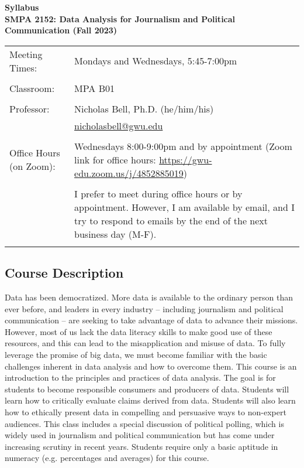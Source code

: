\documentclass[12pt,letterpaper]{article}
\begin{document}
\begin{center}
\large
\textbf{Syllabus\\
\bigskip
SMPA 2152: Data Analysis for Journalism and Political Communication (Fall 2023)}
\end{center}

\begin{tabularx}{\textwidth}{l>{\raggedright\arraybackslash}X}
Meeting Times: & Mondays and Wednesdays, 5:45-7:00pm \\
\\
Classroom: & MPA B01 \\
\\
Professor: & Nicholas Bell, Ph.D. (he/him/his) \\
& \href{mailto:nicholasbell@gwu.edu}{nicholasbell@gwu.edu} \\
\\
Office Hours (on Zoom): & Wednesdays 8:00-9:00pm and by appointment \newline
(Zoom link for office hours: \href{https://gwu-edu.zoom.us/j/4852885019}{https://gwu-edu.zoom.us/j/4852885019})\\
\\
& I prefer to meet during office hours or by appointment. However, I am available by email, and I try to respond to emails by the end of the next business day (M-F).\\
\\
\hline
\end{tabularx}

\subsection*{Course Description}

Data has been democratized. More data is available to the ordinary person than ever before, and leaders in every industry -- including journalism and political communication -- are seeking to take advantage of data to advance their missions. However, most of us lack the data literacy skills to make good use of these resources, and this can lead to the misapplication and misuse of data. To fully leverage the promise of big data, we must become familiar with the basic challenges inherent in data analysis and how to overcome them. This course is an introduction to the principles and practices of data analysis. The goal is for students to become responsible consumers and producers of data. Students will learn how to critically evaluate claims derived from data. Students will also learn how to ethically present data in compelling and persuasive ways to non-expert audiences. This class includes a special discussion of political polling, which is widely used in journalism and political communication but has come under increasing scrutiny in recent years. Students require only a basic aptitude in numeracy (e.g. percentages and averages) for this course. \par
\end{document}
